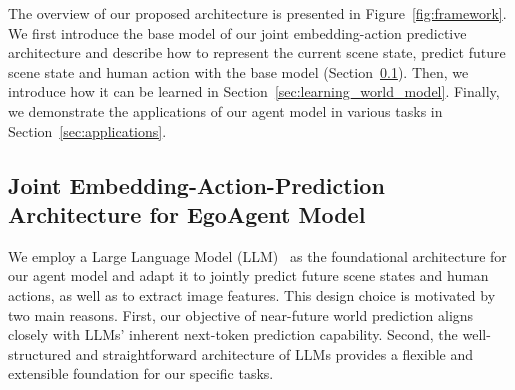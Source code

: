 The overview of our proposed architecture is presented in Figure~\ref{fig:framework}.
We first introduce the base model of our joint embedding-action predictive architecture and describe how to represent the current scene state, predict future scene state and human action with the base model (Section~\ref{sec:joint embedding-action predictive world model}).
Then, we introduce how it can be learned in Section~\ref{sec:learning_world_model}.
Finally, we demonstrate the applications of our agent model in various tasks in Section~\ref{sec:applications}.



\subsection{Joint Embedding-Action-Prediction Architecture for EgoAgent Model}
\label{sec:joint embedding-action predictive world model}

\vspace{1.5mm}
We employ a Large Language Model (LLM)~\cite{team2023internlm,touvron2023llama,sun2024moss,jiang2024mixtral,bai2023qwen} as the foundational architecture for our agent model and adapt it to jointly predict future scene states and human actions, as well as to extract image features.
This design choice is motivated by two main reasons.
First, our objective of near-future world prediction aligns closely with LLMs' inherent next-token prediction capability.
Second, the well-structured and straightforward architecture of LLMs provides a flexible and extensible foundation for our specific tasks.



